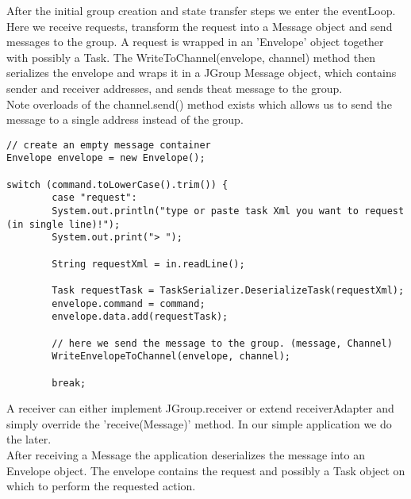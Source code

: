 After the initial group creation and state transfer steps we enter the eventLoop. Here we receive requests, transform the request 
into a Message object and send messages to the group. A request is wrapped in an 'Envelope' object together with possibly a Task.
The WriteToChannel(envelope, channel) method then serializes the envelope and wraps it in a JGroup Message object, which contains 
sender and receiver addresses, and sends theat message to the group.\\

Note overloads of the channel.send() method exists which allows us to send the message to a single address instead of the group.

\pagebreak
\begin{lstlisting}[caption=eventloop]
// create an empty message container
Envelope envelope = new Envelope();

switch (command.toLowerCase().trim()) {
        case "request":
        System.out.println("type or paste task Xml you want to request (in single line)!");
        System.out.print("> ");
            		
        String requestXml = in.readLine();

        Task requestTask = TaskSerializer.DeserializeTask(requestXml);
        envelope.command = command;
        envelope.data.add(requestTask);

        // here we send the message to the group. (message, Channel)
        WriteEnvelopeToChannel(envelope, channel);
            		
   	   	break;

\end{lstlisting}

A receiver can either implement JGroup.receiver or extend receiverAdapter and simply override the 'receive(Message)' method. 
In our simple application we do the later. \\

After receiving a Message the application deserializes the message into an Envelope object.
The envelope contains the request and possibly a Task object on which to perform the requested action.


